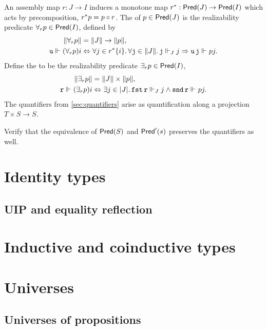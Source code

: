 An assembly map $r : J \to I$ induces a monotone map $\invim{r} : \Pred{J} \to \Pred{I}$ which acts by precomposition, $\invim{r} p = p \circ r$. The  of $p \in \Pred{J}$  is the realizability predicate $\forall_r p \in \Pred{I}$, defined by
%
\begin{align*}
  \T{\forall_r p} &= \T{J} \to \T{p}, \\
  \R{u} \rz (\forall_r p) i &\liff
    \all{j \in \invim{r} \set{i}}
    \all{\R{j} \in \T{J}}
    \R{j} \rz[J] j \lthen \R{u}\,\R{j} \rz p j.
\end{align*}
%
Define the  to be the realizability predicate $\exists_r p \in \Pred{I}$,
%
\begin{align*}
  \T{\exists_r p} &= \T{J} \times \T{p}, \\
  \R{r} \rz (\exists_r p) i &\liff
  \some{j \in \S{J}}
   \combFst\,\R{r} \rz[J] j
   \land
   \combSnd\,\R{r} \rz p j.
\end{align*}
%
The quantifiers from \cref{sec:quantifiers} arise as quantification along a projection $T \times S \to S$.

\begin{exercise}
  Verify that the equivalence of $\Pred{S}$ and $\PredT{s}$ preserves the quantifiers as well.
\end{exercise}

\section{Identity types}
\label{sec:identity-types}

\subsection{UIP and equality reflection}
\label{sec:uip-equal-refl}

\section{Inductive and coinductive types}
\label{sec:inductive-counductive-types}

\section{Universes}
\label{sec:universes}

\subsection{Universes of propositions}
\label{sec:universe-propositions}

